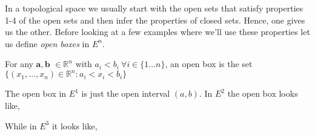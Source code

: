 In a topological space we usually start with the open sets that satisfy properties 1-4 of the open
sets and then infer the properties of closed sets. Hence, one gives us the other. Before looking at
a few examples where we'll use these properties let us define \emph{open boxes}  in $E^n$. 

\begin{Definition}
    For any $\mathbf{a}, \mathbf{b}$ $\in \mathbb{R}^n$ with $a_i < b_i \ \forall i \in \lbrace 1
    \dots n \rbrace$, an open box is the set $ \left.\lbrace \left(x_1,\dots,x_n\right) \in
	\mathbb{R}^n : a_i < x_i < b_i \rbrace\right.$
\end{Definition}
The open box in $E^1$ is just the open interval $(a,b)$. In $E^2$ the open box looks like,


While in $E^3$ it looks like,


